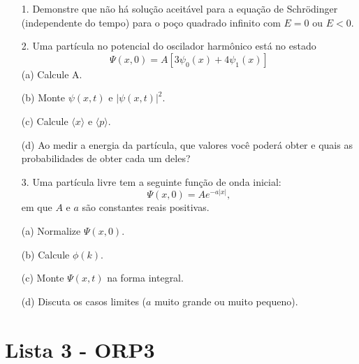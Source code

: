 \begin{itemize}
\item[1.] \textbf{\cite{Griffiths2011}} Demonstre que não há solução aceitável para a equação de Schrödinger (independente do tempo) para o poço quadrado infinito com $E = 0$ ou $E < 0$.

\item[2.] \textbf{\cite{Griffiths2011}} Uma partícula no potencial do oscilador harmônico está no estado
\begin{equation*}
\Psi (x,0) = A[3{\psi}_0 (x) + 4{\psi}_1(x)]
\end{equation*}
(a) Calcule A. 
\par
(b) Monte $\psi(x,t)$ e $|\psi(x,t)|^2$.
\par 
(c) Calcule $\langle x \rangle$ e $\langle p \rangle$.
\par 
(d) Ao medir a energia da partícula, que valores você poderá obter e quais as probabilidades de obter cada um deles?

\item[3.]\textbf{\cite{Griffiths2011}} Uma partícula livre tem a seguinte função de onda inicial:
\begin{equation*}
\Psi (x,0) = A e^{-a|x|},
\end{equation*}
em que $A$ e $a$ são constantes reais positivas.
\par 
(a) Normalize $\Psi(x,0)$.
\par 
(b) Calcule $\phi (k)$.
\par 
(c) Monte $\Psi (x,t)$ na forma integral.
\par 
(d) Discuta os casos limites ($a$ muito grande ou muito pequeno).

\end{itemize}
\newpage
\section{Lista 3 - ORP3} \label{ch:orp3l3}

